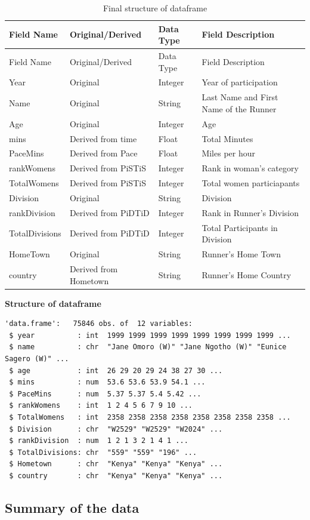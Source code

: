 \documentclass[
]{article}
\begin{document}
\begin{longtable}[]{@{}llll@{}}
\caption{Final structure of dataframe}\tabularnewline
\toprule
Field Name & Original/Derived & Data Type & Field
Description\tabularnewline
\midrule
\endfirsthead
\toprule
Field Name & Original/Derived & Data Type & Field
Description\tabularnewline
\midrule
\endhead
Year & Original & Integer & Year of participation\tabularnewline
Name & Original & String & Last Name and First Name of the
Runner\tabularnewline
Age & Original & Integer & Age\tabularnewline
mins & Derived from time & Float & Total Minutes\tabularnewline
PaceMins & Derived from Pace & Float & Miles per hour\tabularnewline
rankWomens & Derived from PiSTiS & Integer & Rank in woman's
category\tabularnewline
TotalWomens & Derived from PiSTiS & Integer & Total women
particiapants\tabularnewline
Division & Original & String & Division\tabularnewline
rankDivision & Derived from PiDTiD & Integer & Rank in Runner's
Division\tabularnewline
TotalDivisions & Derived from PiDTiD & Integer & Total Participants in
Division\tabularnewline
HomeTown & Original & String & Runner's Home Town\tabularnewline
country & Derived from Hometown & String & Runner's Home
Country\tabularnewline
\bottomrule
\end{longtable}

\textbf{Structure of dataframe}

\begin{verbatim}
'data.frame':   75846 obs. of  12 variables:
 $ year          : int  1999 1999 1999 1999 1999 1999 1999 1999 ...
 $ name          : chr  "Jane Omoro (W)" "Jane Ngotho (W)" "Eunice Sagero (W)" ...
 $ age           : int  26 29 20 29 24 38 27 30 ...
 $ mins          : num  53.6 53.6 53.9 54.1 ...
 $ PaceMins      : num  5.37 5.37 5.4 5.42 ...
 $ rankWomens    : int  1 2 4 5 6 7 9 10 ...
 $ TotalWomens   : int  2358 2358 2358 2358 2358 2358 2358 2358 ...
 $ Division      : chr  "W2529" "W2529" "W2024" ...
 $ rankDivision  : num  1 2 1 3 2 1 4 1 ...
 $ TotalDivisions: chr  "559" "559" "196" ...
 $ Hometown      : chr  "Kenya" "Kenya" "Kenya" ...
 $ country       : chr  "Kenya" "Kenya" "Kenya" ...
\end{verbatim}

\hypertarget{summary-of-the-data}{%
\subsection{Summary of the data}\label{summary-of-the-data}}
\end{document}
